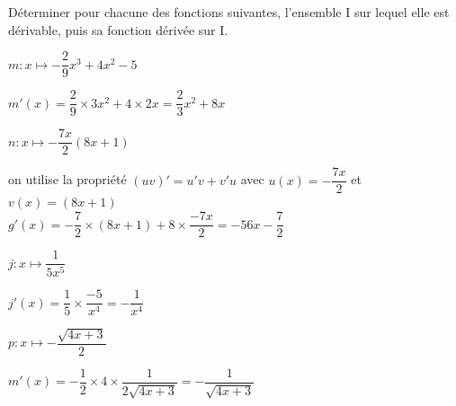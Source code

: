 \documentclass[11pt,a4paper]{article}  %
\begin{document}
\exercice{}

Déterminer pour chacune des fonctions suivantes, l'ensemble I sur lequel elle est dérivable, puis sa fonction dérivée sur I.
	\begin{enumMet}
		\item $m: x \mapsto-\dfrac{2}{9} x^3+4 x^2-5$
		\begin{corrBox}
			$m'(x)=\dfrac{2}{9}\times3x^2+4\times 2x=\dfrac{2}{3}x^2+8x$
		\end{corrBox}
		\item $n: x \mapsto-\dfrac{7 x}{2}(8 x+1)$
		\begin{corrBox}
			on utilise la propriété $(uv)'=u'v+v'u$ avec $u(x)=-\dfrac{7 x}{2}$ et $v(x)=(8 x+1)$\\
			$g'(x)=-\dfrac{7}{2}\times(8x+1)+8\times\dfrac{-7x}{2}=-56x-\dfrac{7}{2}$
		\end{corrBox}
		\item $j: x \mapsto \dfrac{1}{5 x^5}$
		\begin{corrBox}
			$j'(x)=\dfrac{1}{5}\times \dfrac{-5}{x^4}=-\dfrac{1}{x^4}$
		\end{corrBox}
		\item $p: x \mapsto-\dfrac{\sqrt{4 x+3}}{2}$
		\begin{corrBox}
			$m'(x)=-\dfrac{1}{2}\times4\times \dfrac{1}{2\sqrt{4x+3}}=-\dfrac{1}{\sqrt{4x+3}}$
		\end{corrBox}
	\end{enumMet}
\end{document}
